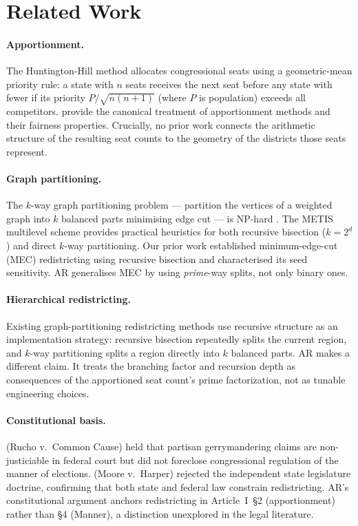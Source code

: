 \section{Related Work}
\label{sec:related}

\paragraph{Apportionment.}
The Huntington-Hill method \citep{huntington1921methods, hill1911method}
allocates congressional seats using a geometric-mean priority rule: a state
with $n$ seats receives the next seat before any state with fewer if its
priority $P / \sqrt{n(n+1)}$ (where $P$ is population) exceeds all competitors.
\citet{balinski2001fair} provide the canonical treatment of apportionment
methods and their fairness properties. Crucially, no prior work connects the
arithmetic structure of the resulting seat counts to the geometry of the
districts those seats represent.

\paragraph{Graph partitioning.}
The $k$-way graph partitioning problem --- partition the vertices of a weighted
graph into $k$ balanced parts minimising edge cut --- is NP-hard
\citep{garey1979computers}. The METIS multilevel scheme
\citep{karypis1998fast} provides practical heuristics for both recursive
bisection ($k = 2^d$) and direct $k$-way partitioning. Our prior work
\citep{dellaLibera2026mec} established minimum-edge-cut (MEC) redistricting
using recursive bisection and characterised its seed sensitivity.
AR generalises MEC by using \emph{prime}-way splits, not only binary ones.

\paragraph{Hierarchical redistricting.}
Existing graph-partitioning redistricting methods use recursive structure as
an implementation strategy: recursive bisection repeatedly splits the current
region, and $k$-way partitioning splits a region directly into $k$ balanced
parts. AR makes a different claim. It treats the branching factor and
recursion depth as consequences of the apportioned seat count's prime
factorization, not as tunable engineering choices.

\paragraph{Constitutional basis.}
\citet{rucho2019} (Rucho v.\ Common Cause) held that partisan gerrymandering
claims are non-justiciable in federal court but did not foreclose congressional
regulation of the manner of elections. \citet{moore2023} (Moore v.\ Harper)
rejected the independent state legislature doctrine, confirming that both state
and federal law constrain redistricting. AR's constitutional argument anchors
redistricting in Article~I~\S2 (apportionment) rather than \S4 (Manner),
a distinction unexplored in the legal literature.

